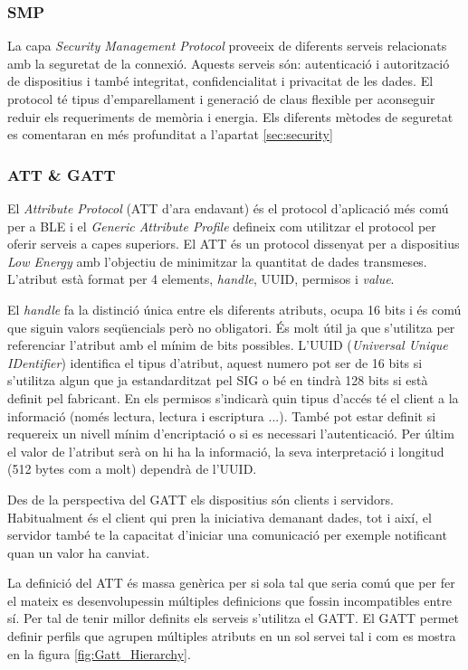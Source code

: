\subsubsection{SMP}
La capa \textit{Security Management Protocol} proveeix de diferents serveis relacionats amb la seguretat de la connexió.
Aquests serveis són: autenticació i autorització de dispositius i també integritat, confidencialitat i privacitat de les dades.
El protocol té tipus d'emparellament i generació de claus flexible per aconseguir reduir els requeriments de memòria i energia.
Els diferents mètodes de seguretat es comentaran en més profunditat a l'apartat \ref{sec:security}

\subsubsection{ATT \& GATT}
El \textit{Attribute Protocol} (ATT d'ara endavant) és el protocol d'aplicació més comú per a BLE i el \textit{Generic Attribute Profile} defineix com utilitzar el protocol per oferir serveis a capes superiors.
El ATT és un protocol dissenyat per a dispositius \textit{Low Energy} amb l'objectiu de minimitzar la quantitat de dades transmeses. L'atribut està format per 4 elements, \textit{handle}, UUID, permisos  i \textit{value}.

El \textit{handle} fa la distinció única entre els diferents atributs, ocupa 16 bits i és comú que siguin valors seqüencials però no obligatori. És molt útil ja que s'utilitza per referenciar l'atribut amb el mínim de bits possibles.
L'UUID (\textit{Universal Unique IDentifier}) identifica el tipus d'atribut, aquest numero pot ser de 16 bits si s'utilitza algun que ja estandarditzat pel SIG o bé en tindrà 128 bits si està definit pel fabricant.
En els permisos s'indicarà quin tipus d'accés té el client a la informació (només lectura, lectura i escriptura ...). També pot estar definit si requereix un nivell mínim d'encriptació o si es necessari l'autenticació.
Per últim el valor de l'atribut serà on hi ha la informació, la seva interpretació i longitud (512 bytes com a molt) dependrà de l'UUID.

Des de la perspectiva del GATT els dispositius són clients i servidors.
Habitualment és el client qui pren la iniciativa demanant dades, tot i així, el servidor també te la capacitat d'iniciar una comunicació per exemple notificant quan un valor ha canviat.

La definició del ATT és massa genèrica per si sola tal que seria comú que per fer el mateix es desenvolupessin múltiples definicions que fossin incompatibles entre sí.
Per tal de tenir millor definits els serveis s'utilitza el GATT.
El GATT permet definir perfils que agrupen múltiples atributs en un sol servei \cite{services} tal i com es mostra en la figura \ref{fig:Gatt_Hierarchy}.

